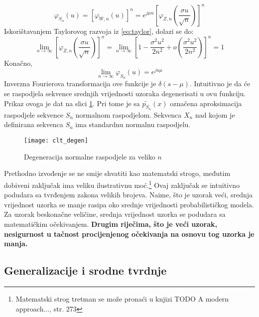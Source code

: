 \begin{equation}
  \varphi_{S_n}(u) = [\varphi_{W,n}(u)]^n
  = e^{j\mu u} \left[\varphi_{Z,n}\left(\frac{\sigma u}{\sqrt{n}}\right)\right]^n
\end{equation}
%
Iskorištavanjem Taylorovog razvoja iz \eqref{eq:taylor}, dolazi se do:
\begin{equation}
  \lim_{n\to\infty}
    \left[\varphi_{Z,n}\left(\frac{\sigma u}{\sqrt{n}}\right)\right]^n
    = \lim_{n\to\infty} \left[1-\frac{\sigma^2u^2}{2n^2} +
      o\left(\frac{\sigma^2u^2}{2n^2}\right)\right]^n
    = 1
\end{equation}
Konačno,
\begin{equation}
  \lim_{n\to\infty} \varphi_{S_n}(u) = e^{ju\mu}
\end{equation}
Inverzna Fourierova transformacija ove funkcije je $\delta(s-\mu)$. Intuitivno
je da će se raspodjela sekvence srednjih vrijednosti uzoraka degenerisati u ovu
funkciju. Prikaz ovoga je dat na slici \ref{fig:clt-degen}. Pri tome je sa
$\widetilde{p_{S_n}}(x)$ označena aproksimacija raspodjele sekvence $S_n$
normalnom raspodjelom. Sekvenca $X_n$ nad kojom je definirana sekvenca $S_n$ ima
standardnu normalnu raspodjelu.

\begin{figure}[H]
  \centering
  \texttt{[image: clt\_degen]}
	\caption{Degeneracija normalne raspodjele za veliko $n$}
  \label{fig:clt-degen}
\end{figure}

Prethodno izvođenje se ne smije shvatiti kao matematski strogo, međutim dobiveni
zaključak ima veliku ilustrativnu moć.\footnote{Matematski strog tretman se može
pronaći u knjizi TODO A modern approach..., str. 273} Ovaj zaključak se intuitivno
podudara sa tvrđenjem zakona velikih brojeva.  Naime, što je uzorak veći,
srednja vrijednost uzorka se manje rasipa oko srednje vrijednosti
probabilističkog modela. Za uzorak beskonačne veličine, srednja vrijednost
uzorka se podudara sa matematičkim očekivanjem.  \textbf{Drugim riječima, što je
veći uzorak, nesigurnost u tačnost procijenjenog očekivanja na osnovu tog uzorka
je manja.}


\subsection{Generalizacije i srodne tvrdnje}

